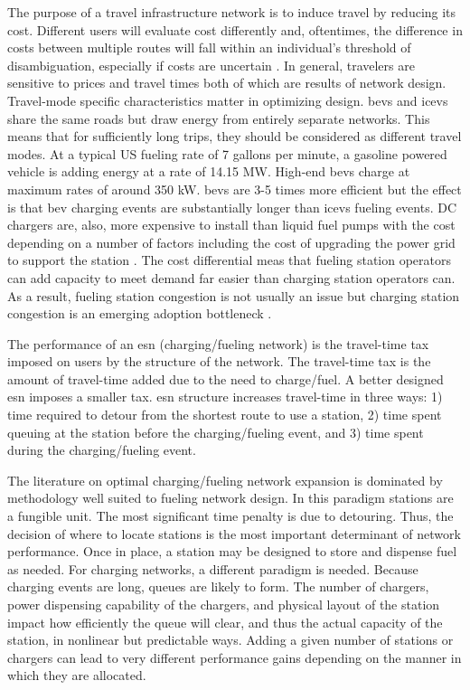 The purpose of a travel infrastructure network is to induce travel by reducing its cost. Different users will evaluate cost differently \citep{Ortuzar_2024, Raveau_2016, BenAkiva_2004} and, oftentimes, the difference in costs between multiple routes will fall within an individual's threshold of disambiguation, especially if costs are uncertain \cite{DePalma_2005}. In general, travelers are sensitive to prices and travel times \cite{Hongli_2017} both of which are results of network design. Travel-mode specific characteristics matter in optimizing design. \glspl{bev} and \glspl{icev} share the same roads but draw energy from entirely separate networks. This means that for sufficiently long trips, they should be considered as different travel modes. At a typical US fueling rate of 7 gallons per minute, a gasoline powered vehicle is adding energy at a rate of 14.15 MW. High-end \glspl{bev} charge at maximum rates of around 350 kW. \glspl{bev} are 3-5 times more efficient \citep{ev_database_2025} but the effect is that \gls{bev} charging events are substantially longer than \glspl{icev} fueling events. DC chargers are, also, more expensive to install than liquid fuel pumps \cite{Miller_2024, Nicholas_2019} with the cost depending on a number of factors including the cost of upgrading the power grid to support the station \cite{Gamage_2023}. The cost differential meas that fueling station operators can add capacity to meet demand far easier than charging station operators can. As a result, fueling station congestion is not usually an issue but charging station congestion is an emerging adoption bottleneck \citep{Jenn_2025}.

The performance of an \gls{esn} (charging/fueling network) is the travel-time tax imposed on users by the structure of the network. The travel-time tax is the amount of travel-time added due to the need to charge/fuel. A better designed \gls{esn} imposes a smaller tax. \gls{esn} structure increases travel-time in three ways: 1) time required to detour from the shortest route to use a station, 2) time spent queuing at the station before the charging/fueling event, and 3) time spent during the charging/fueling event.

The literature on optimal charging/fueling network expansion is dominated by methodology well suited to fueling network design. In this paradigm stations are a fungible unit. The most significant time penalty is due to detouring. Thus, the decision of where to locate stations is the most important determinant of network performance. Once in place, a station may be designed to store and dispense fuel as needed. For charging networks, a different paradigm is needed. Because charging events are long, queues are likely to form. The number of chargers, power dispensing capability of the chargers, and physical layout of the station impact how efficiently the queue will clear, and thus the actual capacity of the station, in nonlinear but predictable ways. Adding a given number of stations or chargers can lead to very different performance gains depending on the manner in which they are allocated.

